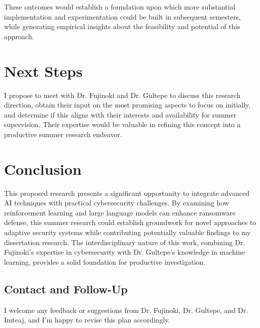 \documentclass[11pt]{article}
\begin{document}
These outcomes would establish a foundation upon which more substantial implementation and experimentation could be built in subsequent semesters, while generating empirical insights about the feasibility and potential of this approach.

\section*{Next Steps}

I propose to meet with Dr. Fujinoki and Dr. Gultepe to discuss this research direction, obtain their input on the most promising aspects to focus on initially, and determine if this aligns with their interests and availability for summer supervision. Their expertise would be valuable in refining this concept into a productive summer research endeavor.

\section*{Conclusion}

This proposed research presents a significant opportunity to integrate advanced AI techniques with practical cybersecurity challenges. By examining how reinforcement learning and large language models can enhance ransomware defense, this summer research could establish groundwork for novel approaches to adaptive security systems while contributing potentially valuable findings to my dissertation research. The interdisciplinary nature of this work, combining Dr. Fujinoki's expertise in cybersecurity with Dr. Gultepe's knowledge in machine learning, provides a solid foundation for productive investigation.

\subsection*{Contact and Follow-Up}
I welcome any feedback or suggestions from Dr. Fujinoki, Dr. Gultepe,  and Dr. Imteaj, and I’m happy to revise this plan accordingly.
\end{document}
